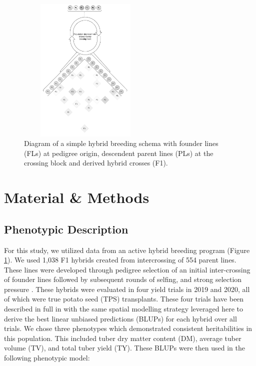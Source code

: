 \begin{figure}
  \begin{center}
    \includegraphics[width=65mm,height=70mm]{./figs_05/describe-breeding.pdf}
  \end{center}
  \caption{Diagram of a simple hybrid breeding schema with founder lines (FLs) at pedigree origin, descendent parent lines (PLs) at the crossing block and derived hybrid crosses (F1).}
  \label{fig-breed}
\end{figure}

\hypertarget{material-methods}{%
\section{Material \& Methods}\label{material-methods}}

\hypertarget{phenotypic-description}{%
\subsection{Phenotypic Description}\label{phenotypic-description}}

For this study, we utilized data from an active hybrid breeding program
(Figure \ref{fig-breed}). We used 1,038 F1 hybrids created from
intercrossing of 554 parent lines. These lines were developed through
pedigree selection of an initial inter-crossing of founder lines
followed by subsequent rounds of selfing, and strong selection pressure
\autocite{Lindhout2011}. These hybrids were evaluated in four yield
trials in 2019 and 2020, all of which were true potato seed (TPS)
transplants. These four trials have been described in full in
\autocite{Adams2023} with the same spatial modelling strategy leveraged
here to derive the best linear unbiased predictions
(BLUPs) for each hybrid over all trials. We chose three phenotypes which
demonstrated consistent heritabilities in this population. This included
tuber dry matter content (DM), average tuber volume (TV), and total
tuber yield (TY). These BLUPs were then used in the following phenotypic
model:

